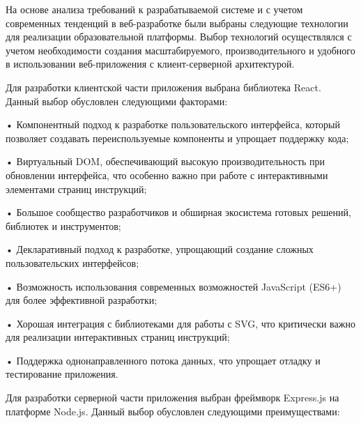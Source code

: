 \subtitlespace

{\gostFont

  \par \redline На основе анализа требований к разрабатываемой системе и с учетом современных тенденций в веб-разработке были выбраны следующие технологии для реализации образовательной платформы. Выбор технологий осуществлялся с учетом необходимости создания масштабируемого, производительного и удобного в использовании веб-приложения с клиент-серверной архитектурой.

  \par \redline Для разработки клиентской части приложения выбрана библиотека React. Данный выбор обусловлен следующими факторами:
  
  \par \redline • Компонентный подход к разработке пользовательского интерфейса, который позволяет создавать переиспользуемые компоненты и упрощает поддержку кода;
  \par \redline • Виртуальный DOM, обеспечивающий высокую производительность при обновлении интерфейса, что особенно важно при работе с интерактивными элементами страниц инструкций;
  \par \redline • Большое сообщество разработчиков и обширная экосистема готовых решений, библиотек и инструментов;
  \par \redline • Декларативный подход к разработке, упрощающий создание сложных пользовательских интерфейсов;
  \par \redline • Возможность использования современных возможностей JavaScript (ES6+) для более эффективной разработки;
  \par \redline • Хорошая интеграция с библиотеками для работы с SVG, что критически важно для реализации интерактивных страниц инструкций;
  \par \redline • Поддержка однонаправленного потока данных, что упрощает отладку и тестирование приложения.

  \par \redline Для разработки серверной части приложения выбран фреймворк Express.js на платформе Node.js. Данный выбор обусловлен следующими преимуществами:
  
}
